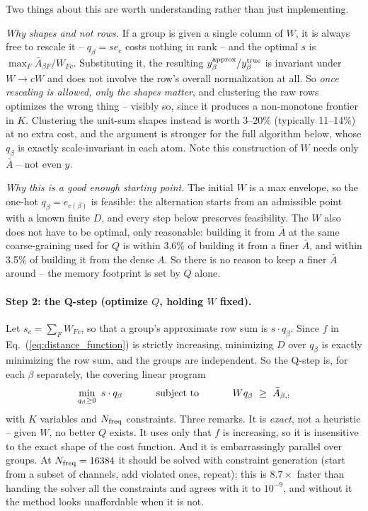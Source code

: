 \documentclass{article}
\numberwithin{equation}{section}   %
\begin{document}
Two things about this are worth understanding rather than just implementing.

{\em Why shapes and not rows.} If a group is given a single column of $W$, it is always
free to rescale it -- $q_\beta = s e_c$ costs nothing in rank -- and the optimal $s$ is
$\max_F \bar A_{\beta F}/W_{Fc}$. Substituting it, the resulting $y^{\rm approx}_\beta /
y^{\rm true}_\beta$ is invariant under $W \to cW$ and does not involve the row's overall
normalization at all. So {\em once rescaling is allowed, only the shapes matter}, and clustering
the raw rows optimizes the wrong thing -- visibly so, since it produces a non-monotone frontier
in $K$. Clustering the unit-sum shapes instead is worth 3--20\% (typically 11--14\%) at no extra
cost, and the argument is stronger for the full algorithm below, whose $q_\beta$ is exactly
scale-invariant in each atom. Note this construction of $W$ needs only $\bar A$ -- not even $y$.

{\em Why this is a good enough starting point.} The initial $W$ is a max envelope, so the
one-hot $q_\beta = e_{c(\beta)}$ is feasible: the alternation starts from an
admissible point with a known finite $D$, and every step below preserves feasibility. The
$W$ also does not have to be optimal, only reasonable: building it from $\bar A$ at the
same coarse-graining used for $Q$ is within 3.6\% of building it from a finer $\bar A$,
and within 3.5\% of building it from the dense $A$. So there is no reason to keep a finer
$\bar A$ around -- the memory footprint is set by $Q$ alone.

\paragraph*{Step 2: the Q-step (optimize $Q$, holding $W$ fixed).}
Let $s_c = \sum_F W_{Fc}$, so that a group's approximate row sum is $s \cdot q_\beta$. Since $f$
in Eq.\ (\ref{eq:distance_function}) is strictly increasing, minimizing $D$ over $q_\beta$ is
exactly minimizing the row sum, and the groups are independent. So the Q-step is, for each
$\beta$ separately, the covering linear program
\begin{equation}
\min_{q_\beta \ge 0} \ s \cdot q_\beta
\hspace{1.2cm}\mbox{subject to}\hspace{1.2cm}
W q_\beta \ \ge \ \bar A_{\beta,:}
\label{eq:varmap_qstep}
\end{equation}
with $K$ variables and $N_{\rm freq}$ constraints. Three remarks. It is {\em exact}, not a
heuristic -- given $W$, no better $Q$ exists. It uses only that $f$ is increasing, so it
is insensitive to the exact shape of the cost function. And it is embarrassingly parallel over
groups. At $N_{\rm freq} = 16384$ it should be solved with constraint generation (start from a
subset of channels, add violated ones, repeat); this is $8.7\times$ faster than handing the
solver all the constraints and agrees with it to $10^{-9}$, and without it the method looks
unaffordable when it is not.
\end{document}
